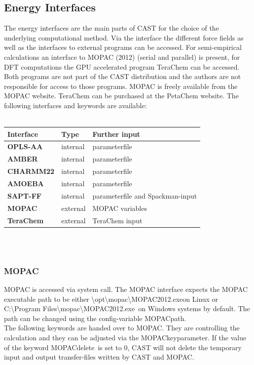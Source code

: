 \documentclass[10pt,a4paper]{article} %
\newif\ifverbose %
\begin{document}
	\subsection{Energy Interfaces}
	The energy interfaces are the main parts of \ac{CAST} for the choice of the underlying computational method. Via the interface the different force fields as well as the interfaces to external programs can be accessed. For semi-empirical calculations an interface to \ac{MOPAC} (2012) (serial\supercite{mopac} and parallel\supercite{mopac_parallel}) is present, for \ac{DFT} computations the \ac{GPU} accelerated program TeraChem\supercite{terachem} can be accessed. Both programs are not part of the \ac{CAST} distribution and the authors are not responsible for access to those programs. \ac{MOPAC}\supercite{mopac, mopac_parallel} is freely available from the \ac{MOPAC} website. TeraChem\supercite{terachem} can be purchased at the PetaChem website.
	The following interfaces and keywords are available:\\~\\
	\begin{tabularx}{\textwidth}{l|l|l}
		Interface & Type & Further input \\
		\hline
		\textbf{OPLS-AA} & internal & parameterfile \\
		\textbf{AMBER} & internal & parameterfile \\
		\textbf{CHARMM22} & internal & parameterfile \\
		\textbf{AMOEBA} & internal & parameterfile\\
		\textbf{SAPT-FF} & internal &parameterfile and Spackman-input\\
		\textbf{MOPAC} & external & MOPAC variables\\
		\textbf{TeraChem} & external & TeraChem input\\
	\end{tabularx}	\\~\\
	\ifverbose
	In contrast to the force fields, the \ac{MOPAC} and TeraChem interfaces do not need correct force field parameters. The coordinate file has to be in TINKER\supercite{tinker} format, however, it can be generated with arbitrary parameters.
	\fi
		\subsubsection{MOPAC}
		\ac{MOPAC} is accessed via system call. The \ac{MOPAC} interface expects the \ac{MOPAC} executable path to be either \glqq \textbackslash opt\textbackslash mopac\textbackslash MOPAC2012.exe\grqq on Linux \ifverbose (yes, the executable default fileending is .exe even on Linux-Systems) \fi or \glqq C:\textbackslash Program Files\textbackslash mopac\textbackslash MOPAC2012.exe\grqq~on Windows systems by default. The path can be changed using the config-variable \glqq MOPACpath\grqq.~\\
		The following keywords are handed over to \ac{MOPAC}. They are controlling the calculation and they can be adjusted via the \glqq MOPACkey\grqq parameter.
		If the value of the keyword \glqq MOPACdelete\grqq \ is set to 0, \ac{CAST} will not delete the temporary input and output transfer-files written by \ac{CAST} and \ac{MOPAC}.
\end{document}

